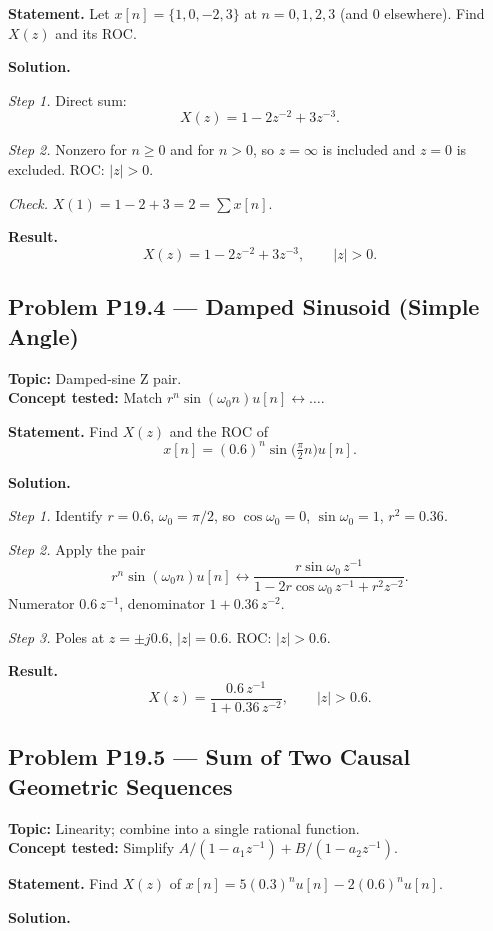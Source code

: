 \documentclass[11pt]{article}
\begin{document}
\textbf{Statement.} Let $x[n] = \{1, 0, -2, 3\}$ at $n = 0,1,2,3$ (and $0$ elsewhere).
Find $X(z)$ and its ROC.

\textbf{Solution.}

\textit{Step 1.} Direct sum:
\[
X(z) = 1 - 2z^{-2} + 3z^{-3}.
\]

\textit{Step 2.} Nonzero for $n\ge 0$ and for $n>0$, so $z=\infty$ is included
and $z=0$ is excluded. ROC: $|z|>0$.

\textit{Check.} $X(1) = 1 - 2 + 3 = 2 = \sum x[n]$. \checkmark

\textbf{Result.}
\[
\boxed{\,X(z) = 1 - 2z^{-2} + 3z^{-3},\qquad |z|>0.\,}
\]

\subsection{Problem P19.4 --- Damped Sinusoid (Simple Angle)}
\textbf{Topic:} Damped-sine Z pair.\\
\textbf{Concept tested:} Match $r^{n}\sin(\omega_{0}n)u[n]\leftrightarrow\ldots$.

\textbf{Statement.} Find $X(z)$ and the ROC of
\[
x[n] = (0.6)^{n}\sin\!\bigl(\tfrac{\pi}{2}n\bigr)u[n].
\]

\textbf{Solution.}

\textit{Step 1.} Identify $r = 0.6$, $\omega_{0} = \pi/2$, so $\cos\omega_{0}=0$,
$\sin\omega_{0}=1$, $r^{2}=0.36$.

\textit{Step 2.} Apply the pair
\[
r^{n}\sin(\omega_{0}n)u[n]\leftrightarrow \frac{r\sin\omega_{0}\,z^{-1}}{1 - 2r\cos\omega_{0}\,z^{-1}+r^{2}z^{-2}}.
\]
Numerator $0.6\,z^{-1}$, denominator $1 + 0.36\,z^{-2}$.

\textit{Step 3.} Poles at $z=\pm j0.6$, $|z|=0.6$. ROC: $|z|>0.6$.

\textbf{Result.}
\[
\boxed{\,X(z) = \frac{0.6\,z^{-1}}{1+0.36\,z^{-2}},\qquad |z|>0.6.\,}
\]

\subsection{Problem P19.5 --- Sum of Two Causal Geometric Sequences}
\textbf{Topic:} Linearity; combine into a single rational function.\\
\textbf{Concept tested:} Simplify $A/(1-a_{1}z^{-1})+B/(1-a_{2}z^{-1})$.

\textbf{Statement.} Find $X(z)$ of $x[n] = 5(0.3)^{n}u[n] - 2(0.6)^{n}u[n]$.

\textbf{Solution.}
\end{document}
